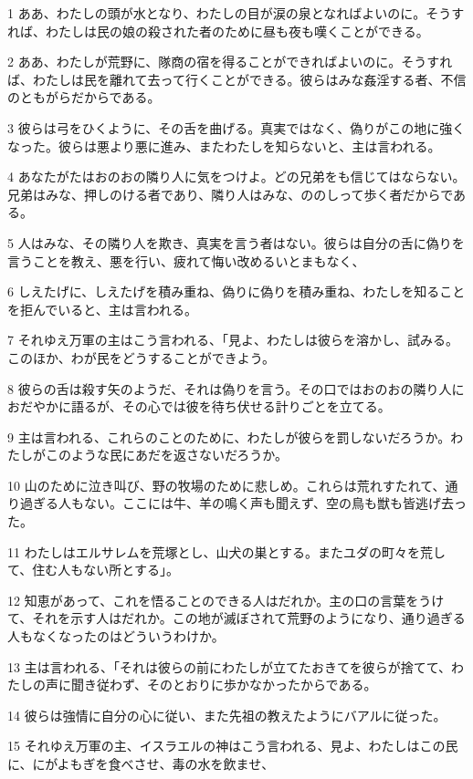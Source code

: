 \par 1 ああ、わたしの頭が水となり、わたしの目が涙の泉となればよいのに。そうすれば、わたしは民の娘の殺された者のために昼も夜も嘆くことができる。
\par 2 ああ、わたしが荒野に、隊商の宿を得ることができればよいのに。そうすれば、わたしは民を離れて去って行くことができる。彼らはみな姦淫する者、不信のともがらだからである。
\par 3 彼らは弓をひくように、その舌を曲げる。真実ではなく、偽りがこの地に強くなった。彼らは悪より悪に進み、またわたしを知らないと、主は言われる。
\par 4 あなたがたはおのおの隣り人に気をつけよ。どの兄弟をも信じてはならない。兄弟はみな、押しのける者であり、隣り人はみな、ののしって歩く者だからである。
\par 5 人はみな、その隣り人を欺き、真実を言う者はない。彼らは自分の舌に偽りを言うことを教え、悪を行い、疲れて悔い改めるいとまもなく、
\par 6 しえたげに、しえたげを積み重ね、偽りに偽りを積み重ね、わたしを知ることを拒んでいると、主は言われる。
\par 7 それゆえ万軍の主はこう言われる、「見よ、わたしは彼らを溶かし、試みる。このほか、わが民をどうすることができよう。
\par 8 彼らの舌は殺す矢のようだ、それは偽りを言う。その口ではおのおの隣り人におだやかに語るが、その心では彼を待ち伏せる計りごとを立てる。
\par 9 主は言われる、これらのことのために、わたしが彼らを罰しないだろうか。わたしがこのような民にあだを返さないだろうか。
\par 10 山のために泣き叫び、野の牧場のために悲しめ。これらは荒れすたれて、通り過ぎる人もない。ここには牛、羊の鳴く声も聞えず、空の鳥も獣も皆逃げ去った。
\par 11 わたしはエルサレムを荒塚とし、山犬の巣とする。またユダの町々を荒して、住む人もない所とする」。
\par 12 知恵があって、これを悟ることのできる人はだれか。主の口の言葉をうけて、それを示す人はだれか。この地が滅ぼされて荒野のようになり、通り過ぎる人もなくなったのはどういうわけか。
\par 13 主は言われる、「それは彼らの前にわたしが立てたおきてを彼らが捨てて、わたしの声に聞き従わず、そのとおりに歩かなかったからである。
\par 14 彼らは強情に自分の心に従い、また先祖の教えたようにバアルに従った。
\par 15 それゆえ万軍の主、イスラエルの神はこう言われる、見よ、わたしはこの民に、にがよもぎを食べさせ、毒の水を飲ませ、
